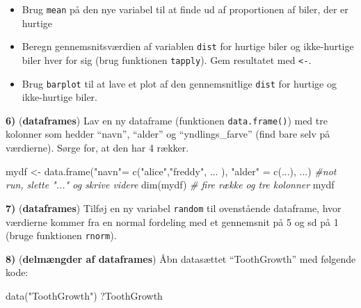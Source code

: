 \documentclass[
]{book}
\newenvironment{Shaded}{\begin{snugshade}}{\end{snugshade}}
\newcommand{\CommentTok}[1]{\textcolor[rgb]{0.56,0.35,0.01}{\textit{#1}}}
\newcommand{\FunctionTok}[1]{\textcolor[rgb]{0.00,0.00,0.00}{#1}}
\newcommand{\NormalTok}[1]{#1}
\newcommand{\OtherTok}[1]{\textcolor[rgb]{0.56,0.35,0.01}{#1}}
\newcommand{\SpecialCharTok}[1]{\textcolor[rgb]{0.00,0.00,0.00}{#1}}
\newcommand{\StringTok}[1]{\textcolor[rgb]{0.31,0.60,0.02}{#1}}
\providecommand{\tightlist}{%
  \setlength{\itemsep}{0pt}\setlength{\parskip}{0pt}}
\begin{document}
\begin{itemize}
\tightlist
\item
  Brug \texttt{mean} på den nye variabel til at finde ud af proportionen af biler, der er hurtige
\item
  Beregn gennemsnitsværdien af variablen \texttt{dist} for hurtige biler og ikke-hurtige biler hver for sig (brug funktionen \texttt{tapply}). Gem resultatet med \texttt{\textless{}-}.
\item
  Brug \texttt{barplot} til at lave et plot af den gennemsnitlige \texttt{dist} for hurtige og ikke-hurtige biler.
\end{itemize}

\textbf{6)} (\textbf{dataframes}) Lav en ny dataframe (funktionen \texttt{data.frame()}) med tre kolonner som hedder ``navn'', ``alder'' og ``yndlings\_farve'' (find bare selv på værdierne). Sørge for, at den har 4 rækker.

\begin{Shaded}
\begin{Highlighting}[]
\NormalTok{mydf }\OtherTok{\textless{}{-}} \FunctionTok{data.frame}\NormalTok{(}\StringTok{"navn"}\OtherTok{=} \FunctionTok{c}\NormalTok{(}\StringTok{"alice"}\NormalTok{,}\StringTok{"freddy"}\NormalTok{, ... ), }\StringTok{"alder"} \OtherTok{=} \FunctionTok{c}\NormalTok{(...), ...) }\CommentTok{\#not run, slette "..." og skrive videre}
\FunctionTok{dim}\NormalTok{(mydf) }\CommentTok{\# fire række og tre kolonner}
\NormalTok{mydf}
\end{Highlighting}
\end{Shaded}

\textbf{7)} (\textbf{dataframes}) Tilføj en ny variabel \texttt{random} til ovenstående dataframe, hvor værdierne kommer fra en normal fordeling med et gennemsnit på 5 og sd på 1 (bruge funktionen \texttt{rnorm}).

\begin{Shaded}
\end{Shaded}

\textbf{8)} (\textbf{delmængder af dataframes}) Åbn datasættet ``ToothGrowth'' med følgende kode:

\begin{Shaded}
\begin{Highlighting}[]
\FunctionTok{data}\NormalTok{(}\StringTok{"ToothGrowth"}\NormalTok{)}
\NormalTok{?ToothGrowth}
\end{Highlighting}
\end{Shaded}
\end{document}
